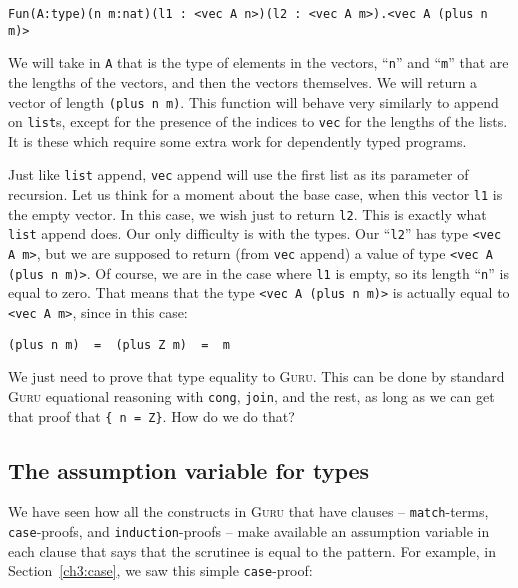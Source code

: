 \documentclass{book}[12pt]
\newcommand{\guru}[0]{\textsc{Guru}\xspace}
\begin{document}
\begin{verbatim}
Fun(A:type)(n m:nat)(l1 : <vec A n>)(l2 : <vec A m>).<vec A (plus n m)>
\end{verbatim}

\noindent We will take in \texttt{A} that is the type of elements in
the vectors, ``\texttt{n}'' and ``\texttt{m}'' that are the lengths of
the vectors, and then the vectors themselves.  We will return a vector
of length \texttt{(plus n m)}.  This function will behave very
similarly to append on \texttt{list}s, except for the presence of the
indices to \texttt{vec} for the lengths of the lists.  It is these
which require some extra work for dependently typed programs.  

Just like \texttt{list} append, \texttt{vec} append will use the first
list as its parameter of recursion.  Let us think for a moment about
the base case, when this vector \texttt{l1} is the empty vector.  In
this case, we wish just to return \texttt{l2}.  This is exactly what
\texttt{list} append does.  Our only difficulty is with the types.
Our ``\texttt{l2}'' has type \texttt{<vec A m>}, but we are supposed
to return (from \texttt{vec} append) a value of type \texttt{<vec A
(plus n m)>}.  Of course, we are in the case where \texttt{l1} is
empty, so its length ``\texttt{n}'' is equal to zero.  That means
that the type \texttt{<vec A (plus n m)>} is actually equal to \texttt{<vec A m>},
since in this case:

\begin{verbatim}
(plus n m)  =  (plus Z m)  =  m
\end{verbatim}

\noindent We just need to prove that type equality to \guru.  This can be
done by standard \guru equational reasoning with \texttt{cong}, \texttt{join},
and the rest, as long as we can get that proof that \texttt{\{ n = Z\}}.  How
do we do that?  

\subsection{The assumption variable for types}
\label{ch7:assumpvar}

We have seen how all the constructs in \guru that have clauses --
\texttt{match}-terms, \texttt{case}-proofs, and
\texttt{induction}-proofs -- make available an assumption variable
in each clause that says that the scrutinee is equal to the pattern.
For example, in Section~\ref{ch3:case}, we saw this simple \texttt{case}-proof:
\end{document}
